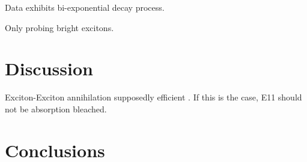 Data exhibits bi-exponential decay process.


Only probing bright excitons.

\clearpage

\section{Discussion}

Exciton-Exciton annihilation supposedly efficient \cite{murakami2009existence}. If this is the case, E11 should not be absorption bleached.


\section{Conclusions}
